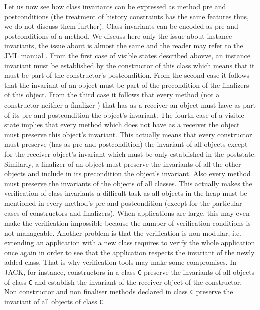         Let us now see how  class invariants   can be expressed as 
	method pre and postconditions (the treatment of history constraints has the same features thus, we do not discuss them further).
        Class invariants can be encoded as pre and postconditions of a method. We discuss here only the issue about 
	instance invariants, the issue about is almost the same and the reader may refer to the JML manual \cite{JMLRefMan}.
	From the first case of visible states described abovve, an instance invariant  must
	be established by the constructor of this class which means that it must be part of the constructor's postcondition. 
	From the  second case it follows that the invariant of an object must be part of the precondition of the finalizers of this object.
	From the third case it follows that every method (not a constructor neither a finalizer ) that has as a receiver an object
	must have as part of its pre and postcondition the object's invariant. The fourth case of a visible state implies that every method which does not have
	as a receiver the object must preserve this object's invariant.
	This actually means that every constructor must preserve  (has as pre and postcondition)  the invariant of
	all objects except for the receiver object's invariant which must be only established
	in the poststate. Similarly, a finalizer of an object must preserve the invariants of all the other objects and include in its precondition 
	the object's invariant. Also every method must preserve
	the invariants of the objects of all classes.
	This actually makes the verification of class invariants a difficult task as all objects in 
	the heap must be mentioned in every method's pre and postcondition (except for the particular cases of constructors and finalizers).  
	When applications are large, this may even make the verification impossible because the number of verification conditions is not manageable.
	Another problem is that the verification is non modular, i.e. extending an application with a new class requires to verify the whole application once again 
	in order to see that the application respects the invariant of the newly added class.
	That is why verification tools may make some compromises.  
	In JACK, for instance, constructors in a class \texttt{C} preserve the invariants of all objects of class \texttt{C} and establish the invariant of the receiver
	object of the constructor. Non constructor and non finaliser methods declared in class \texttt{C} preserve the invariant of all objects of class \texttt{C}.   
	 
